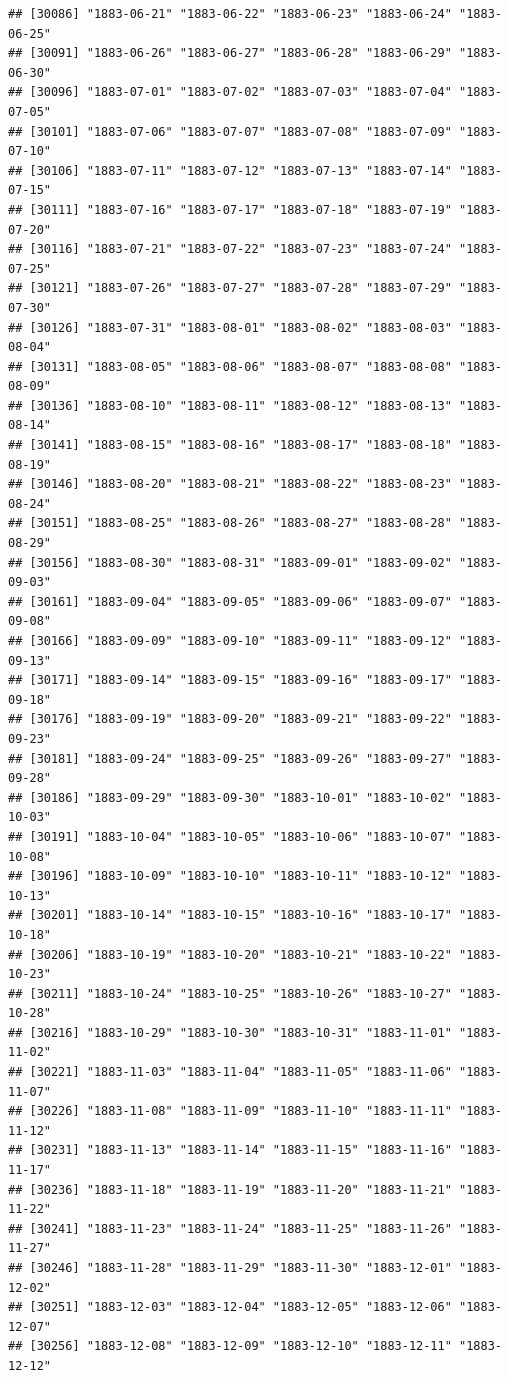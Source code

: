 \documentclass{article}\usepackage[]{graphicx}\usepackage[]{color}
\makeatletter
\newenvironment{kframe}{%
 \def\at@end@of@kframe{}%
 \ifinner\ifhmode%
  \def\at@end@of@kframe{\end{minipage}}%
  \begin{minipage}{\columnwidth}%
 \fi\fi%
 \def\FrameCommand##1{\hskip\@totalleftmargin \hskip-\fboxsep
 \colorbox{shadecolor}{##1}\hskip-\fboxsep
     \hskip-\linewidth \hskip-\@totalleftmargin \hskip\columnwidth}%
 \MakeFramed {\advance\hsize-\width
   \@totalleftmargin\z@ \linewidth\hsize
   \@setminipage}}%
 {\par\unskip\endMakeFramed%
 \at@end@of@kframe}
\newenvironment{knitrout}{}{} %
\makeatother
\begin{document}
\begin{description}
\begin{knitrout}
\begin{kframe}
\begin{verbatim}
## [30086] "1883-06-21" "1883-06-22" "1883-06-23" "1883-06-24" "1883-06-25"
## [30091] "1883-06-26" "1883-06-27" "1883-06-28" "1883-06-29" "1883-06-30"
## [30096] "1883-07-01" "1883-07-02" "1883-07-03" "1883-07-04" "1883-07-05"
## [30101] "1883-07-06" "1883-07-07" "1883-07-08" "1883-07-09" "1883-07-10"
## [30106] "1883-07-11" "1883-07-12" "1883-07-13" "1883-07-14" "1883-07-15"
## [30111] "1883-07-16" "1883-07-17" "1883-07-18" "1883-07-19" "1883-07-20"
## [30116] "1883-07-21" "1883-07-22" "1883-07-23" "1883-07-24" "1883-07-25"
## [30121] "1883-07-26" "1883-07-27" "1883-07-28" "1883-07-29" "1883-07-30"
## [30126] "1883-07-31" "1883-08-01" "1883-08-02" "1883-08-03" "1883-08-04"
## [30131] "1883-08-05" "1883-08-06" "1883-08-07" "1883-08-08" "1883-08-09"
## [30136] "1883-08-10" "1883-08-11" "1883-08-12" "1883-08-13" "1883-08-14"
## [30141] "1883-08-15" "1883-08-16" "1883-08-17" "1883-08-18" "1883-08-19"
## [30146] "1883-08-20" "1883-08-21" "1883-08-22" "1883-08-23" "1883-08-24"
## [30151] "1883-08-25" "1883-08-26" "1883-08-27" "1883-08-28" "1883-08-29"
## [30156] "1883-08-30" "1883-08-31" "1883-09-01" "1883-09-02" "1883-09-03"
## [30161] "1883-09-04" "1883-09-05" "1883-09-06" "1883-09-07" "1883-09-08"
## [30166] "1883-09-09" "1883-09-10" "1883-09-11" "1883-09-12" "1883-09-13"
## [30171] "1883-09-14" "1883-09-15" "1883-09-16" "1883-09-17" "1883-09-18"
## [30176] "1883-09-19" "1883-09-20" "1883-09-21" "1883-09-22" "1883-09-23"
## [30181] "1883-09-24" "1883-09-25" "1883-09-26" "1883-09-27" "1883-09-28"
## [30186] "1883-09-29" "1883-09-30" "1883-10-01" "1883-10-02" "1883-10-03"
## [30191] "1883-10-04" "1883-10-05" "1883-10-06" "1883-10-07" "1883-10-08"
## [30196] "1883-10-09" "1883-10-10" "1883-10-11" "1883-10-12" "1883-10-13"
## [30201] "1883-10-14" "1883-10-15" "1883-10-16" "1883-10-17" "1883-10-18"
## [30206] "1883-10-19" "1883-10-20" "1883-10-21" "1883-10-22" "1883-10-23"
## [30211] "1883-10-24" "1883-10-25" "1883-10-26" "1883-10-27" "1883-10-28"
## [30216] "1883-10-29" "1883-10-30" "1883-10-31" "1883-11-01" "1883-11-02"
## [30221] "1883-11-03" "1883-11-04" "1883-11-05" "1883-11-06" "1883-11-07"
## [30226] "1883-11-08" "1883-11-09" "1883-11-10" "1883-11-11" "1883-11-12"
## [30231] "1883-11-13" "1883-11-14" "1883-11-15" "1883-11-16" "1883-11-17"
## [30236] "1883-11-18" "1883-11-19" "1883-11-20" "1883-11-21" "1883-11-22"
## [30241] "1883-11-23" "1883-11-24" "1883-11-25" "1883-11-26" "1883-11-27"
## [30246] "1883-11-28" "1883-11-29" "1883-11-30" "1883-12-01" "1883-12-02"
## [30251] "1883-12-03" "1883-12-04" "1883-12-05" "1883-12-06" "1883-12-07"
## [30256] "1883-12-08" "1883-12-09" "1883-12-10" "1883-12-11" "1883-12-12"

\end{verbatim}
\end{kframe}
\end{knitrout}
\end{description}
\end{document}
